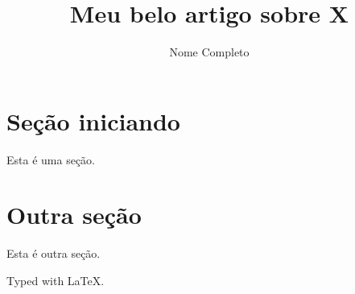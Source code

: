 \documentclass[twocolumn,a4paper,12pt]{article}
\title{Meu belo artigo sobre X}
\author{Nome Completo}
\begin{document}
\maketitle

\section{Seção iniciando}

Esta é uma seção.

\section{Outra seção}

Esta é outra seção.

%



\vfill

Typed with \LaTeX.
\end{document}
